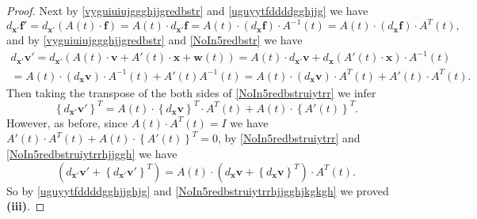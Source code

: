 \documentclass{article}
\theoremstyle{definition}
\theoremstyle{remark}
\renewcommand{\vec}[1]{\mathbf{#1}}
\newcommand{\er}{\eqref}
\newcommand{\er}{\eqref}
\begin{document}
\begin{proof}
 Next by \er{vyguiuiujggghjjgredbstr} and \er{uguyytfddddgghjjg} we
have
\begin{equation}\label{uguyytfddddgghjjghjg}
d_{\vec x'}\vec f'=d_{\vec x'}\left(A(t)\cdot\vec f\right)=A(t)\cdot
d_{\vec x'}\vec f=A(t)\cdot\left(d_{\vec x}\vec f\right)\cdot
A^{-1}(t)=A(t)\cdot\left(d_{\vec x}\vec f\right)\cdot A^T(t),
\end{equation}
and by \er{vyguiuiujggghjjgredbstr} and \er{NoIn5redbstr} we have
\begin{multline}
\label{NoIn5redbstruiytrr} d_{\vec x'}\vec v'=d_{\vec
x'}\left(A(t)\cdot \vec v+ A'(t) \cdot\vec x+ \vec
w(t)\right)=A(t)\cdot d_{\vec x'}\vec v+d_{\vec x}\left(A'(t)
\cdot\vec x\right)\cdot A^{-1}(t)\\=A(t)\cdot\left(d_{\vec x}\vec
v\right)\cdot A^{-1}(t)+A'(t)A^{-1}(t)=A(t)\cdot\left(d_{\vec x}\vec
v\right)\cdot A^T(t)+A'(t)\cdot A^T(t).
\end{multline}
Then taking the transpose of the both sides of
\er{NoIn5redbstruiytrr} we infer
\begin{equation}
\label{NoIn5redbstruiytrrhjjggh} \left\{d_{\vec x'}\vec
v'\right\}^T=A(t)\cdot\left\{d_{\vec x}\vec v\right\}^T\cdot
A^T(t)+A(t)\cdot \left\{A'(t)\right\}^T.
\end{equation}
However, as before, since $A(t)\cdot A^T(t)=I$ we have $A'(t)\cdot
A^T(t)+A(t)\cdot \left\{A'(t)\right\}^T=0$, by
\er{NoIn5redbstruiytrr} and \er{NoIn5redbstruiytrrhjjggh} we have
\begin{equation}
\label{NoIn5redbstruiytrrhjjgghjkgkgh} \left(d_{\vec x'}\vec
v'+\left\{d_{\vec x'}\vec v'\right\}^T\right)=A(t)\cdot\left(d_{\vec
x}\vec v+\left\{d_{\vec x}\vec v\right\}^T\right)\cdot A^T(t).
\end{equation}
So by \er{uguyytfddddgghjjghjg} and
\er{NoIn5redbstruiytrrhjjgghjkgkgh} we proved {\bf(iii)}.


\end{proof}
\end{document}
